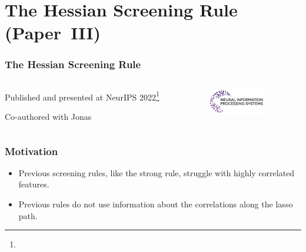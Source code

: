 \documentclass[10pt]{beamer}
\begin{document}
\section{The Hessian Screening Rule (Paper~III)}

\begin{frame}[c]
  \frametitle{The Hessian Screening Rule}

  \begin{columns}
    \begin{column}{0.45\textwidth}

      Published and presented at NeurIPS 2022\footnote[frame]{}

      \bigskip

      Co-authored with Jonas
    \end{column}
    \begin{column}{0.45\textwidth}
      \includegraphics[width=\textwidth]{figures/neurips.pdf}
    \end{column}
  \end{columns}
\end{frame}

\begin{frame}[c]
  \frametitle{Motivation}

  \begin{itemize}
    \item Previous screening rules, like the strong rule, struggle with highly correlated features.
    \item Previous rules do not use information about the correlations along the lasso path.
  \end{itemize}
\end{frame}

%
%
%
%
%
\end{document}
